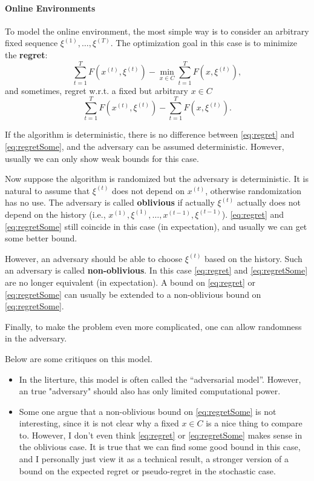 \documentclass[openany]{book}
\theoremstyle{definition}
\theoremstyle{remark}
\begin{document}
\paragraph{Online Environments}
To model the online environment, the most simple way is to consider an arbitrary fixed sequence $\xi^{(1)},\ldots,\xi^{(T)}$. The optimization goal in this case is to minimize the \textbf{regret}:
\begin{equation}\label{eq:regret}
    \sum_{t=1}^{T}F(x^{(t)},\xi^{(t)})-\min_{x\in C}\sum_{t=1}^{T}F(x,\xi^{(t)}),
\end{equation}
and sometimes, regret w.r.t. a fixed but arbitrary $x\in C$
\begin{equation}\label{eq:regretSome}
    \sum_{t=1}^{T}F(x^{(t)},\xi^{(t)})-\sum_{t=1}^{T}F(x,\xi^{(t)}).
\end{equation}

If the algorithm is deterministic, there is no difference between \eqref{eq:regret} and \eqref{eq:regretSome}, and the adversary can be assumed deterministic. However, usually we can only show weak bounds for this case.

Now suppose the algorithm is randomized but the adversary is deterministic. It is natural to assume that $\xi^{(t)}$ does not depend on $x^{(t)}$, otherwise randomization has no use. The adversary is called \textbf{oblivious} if actually $\xi^{(t)}$ actually does not depend on the history (i.e., $x^{(1)},\xi^{(1)},\ldots,x^{(t-1)},\xi^{(t-1)}$). \eqref{eq:regret} and \eqref{eq:regretSome} still coincide in this case (in expectation), and usually we can get some better bound.

However, an adversary should be able to choose $\xi^{(t)}$ based on the history. Such an adversary is called \textbf{non-oblivious}. In this case \eqref{eq:regret} and \eqref{eq:regretSome} are no longer equivalent (in expectation). A bound on \eqref{eq:regret} or \eqref{eq:regretSome} can usually be extended to a non-oblivious bound on \eqref{eq:regretSome}.

Finally, to make the problem even more complicated, one can allow randomness in the adversary.

Below are some critiques on this model.
\begin{itemize}
    \item In the literture, this model is often called the ``adversarial model''. However, an true "adversary" should also has only limited computational power.

    \item Some one argue that a non-oblivious bound on \eqref{eq:regretSome} is not interesting, since it is not clear why a fixed $x\in C$ is a nice thing to compare to. However, I don't even think \eqref{eq:regret} or \eqref{eq:regretSome} makes sense in the oblivious case. It is true that we can find some good bound in this case, and I personally just view it as a technical result, a stronger version of a bound on the expected regret or pseudo-regret in the stochastic case.
\end{itemize}
\end{document}
